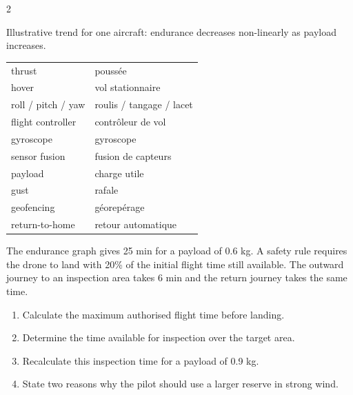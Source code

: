 \begin{multicols}{2}
\begin{tcolorbox}[title=\sffamily\bfseries Payload and endurance,colback=white,colframe=ECOrange]
\begin{center}
\end{center}
\footnotesize Illustrative trend for one aircraft: endurance decreases non-linearly as payload increases.
\end{tcolorbox}

\begin{vocabulary}
\begin{tabularx}{\linewidth}{@{}lX@{}}
thrust & poussée\\
hover & vol stationnaire\\
roll / pitch / yaw & roulis / tangage / lacet\\
flight controller & contrôleur de vol\\
gyroscope & gyroscope\\
sensor fusion & fusion de capteurs\\
payload & charge utile\\
gust & rafale\\
geofencing & géorepérage\\
return-to-home & retour automatique
\end{tabularx}
\end{vocabulary}

\begin{applicationexercise}
The endurance graph gives 25 min for a payload of 0.6 kg. A safety rule requires the drone to land
with 20\% of the initial flight time still available. The outward journey to an inspection area takes
6 min and the return journey takes the same time.
\begin{enumerate}
\item Calculate the maximum authorised flight time before landing.
\item Determine the time available for inspection over the target area.
\item Recalculate this inspection time for a payload of 0.9 kg.
\item State two reasons why the pilot should use a larger reserve in strong wind.
\end{enumerate}
\end{applicationexercise}


\end{multicols}
